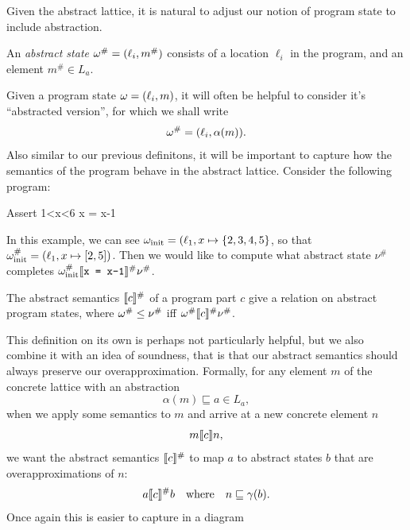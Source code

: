 Given the abstract lattice, it is natural to adjust our notion of program state to include abstraction.
\begin{definition}
  An \emph{abstract state} $\omega^\# = (\ell_i, m^\#)$ consists of a location $\ell_i$ in the program, and an element $m^\# \in L_a$.
\end{definition}
Given a program state $\omega = (\ell_i, m)$, it will often be helpful to consider it's ``abstracted version'', for which we shall write
\[
  \omega^\# = (\ell_i, \alpha(m)).
\]
Also similar to our previous definitons, it will be important to capture how the semantics of the program behave in the abstract lattice.
Consider the following program:
\begin{code}
Assert 1<x<6
x = x-1
\end{code}
In this example, we can see $\omega_{\text{init}} = (\ell_1, x \mapsto \{2, 3, 4, 5\}$, so that $\omega_{\text{init}}^\# = (\ell_1, x \mapsto [2, 5])$.
Then we would like to compute what abstract state $\nu^\#$ completes $\omega_{\text{init}}^\# \llbracket \texttt{x = x-1} \rrbracket ^\# \nu^\#$.

\begin{definition}
 The abstract semantics $\llbracket c \rrbracket ^\#$ of a program part $c$ give a relation on abstract program states, where $\omega^\# \leq \nu^\#$ iff $\omega^\# \llbracket c \rrbracket ^\# \nu^\#$.
\end{definition}

This definition on its own is perhaps not particularly helpful, but we also combine it with an idea of soundness, that is that our abstract semantics should always preserve our overapproximation.
Formally, for any element $m$ of the concrete lattice with an abstraction
\[
  \alpha(m) \sqsubseteq a\in L_a,
\]
when we apply some semantics to $m$ and arrive at a new concrete element $n$
\[
  m \llbracket c \rrbracket n,
\]
we want the abstract semantics $\llbracket c \rrbracket ^\#$ to map $a$ to abstract states $b$ that are overapproximations of $n$:
\[
  a \llbracket c \rrbracket ^\# b \quad \text{where} \quad n \sqsubseteq \gamma(b).
\]
Once again this is easier to capture in a diagram
\begin{figure}[h]
\centering
{}
\end{figure}

